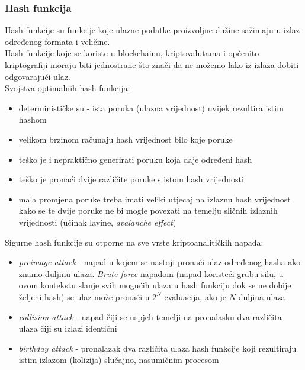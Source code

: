 \documentclass[12pt]{article}
\begin{document}
\subsubsection{Hash funkcija}
Hash funkcije su funkcije koje ulazne podatke proizvoljne dužine sažimaju u izlaz određenog formata i veličine.\\
Hash funkcije koje se koriste u blockchainu, kriptovalutama i općenito kriptografiji moraju biti jednostrane što znači da ne možemo lako iz izlaza dobiti odgovarajući ulaz.\\
Svojstva optimalnih hash funkcija:
\begin{itemize}
	\item determinističke su - ista poruka (ulazna vrijednost) uvijek rezultira istim hashom
	\item velikom brzinom računaju hash vrijednost bilo koje poruke
	\item teško je i nepraktično generirati poruku koja daje određeni hash
	\item teško je pronaći dvije različite poruke s istom hash vrijednosti
	\item mala promjena poruke treba imati veliki utjecaj na izlaznu hash vrijednost kako se te dvije poruke ne bi mogle povezati na temelju sličnih izlaznih vrijednosti (učinak lavine, \textit{avalanche effect})\cite{ideal-hash-fun}
\end{itemize}
%
\pagebreak
Sigurne hash funkcije su otporne na sve vrste kriptoanalitičkih napada:
\begin{itemize}
	\item \textit{preimage attack} - napad u kojem se nastoji pronaći ulaz određenog hasha ako znamo duljinu ulaza. \textit{Brute force} napadom (napad koristeći grubu silu, u ovom kontekstu slanje svih mogućih ulaza u hash funkciju dok se ne dobije željeni hash) se ulaz može pronaći u $2^N$ evaluacija, ako je $N$ duljina ulaza
	\item \textit{collision attack} - napad čiji se uspjeh temelji na pronalasku dva različita ulaza čiji su izlazi identični
	\item \textit{birthday attack} - pronalazak dva različita ulaza hash funkcije koji rezultiraju istim izlazom (kolizija) slučajno, nasumičnim procesom
\end{itemize}
\end{document}

